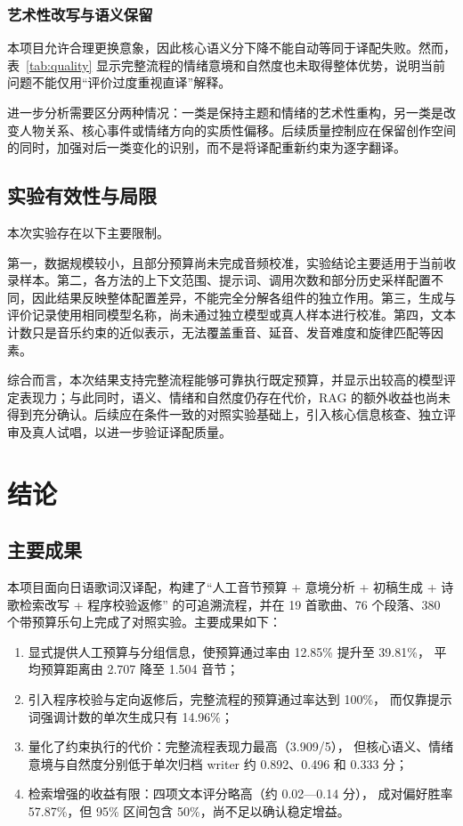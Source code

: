 \documentclass[12pt, a4paper]{ctexart}
\numberwithin{table}{section}
\numberwithin{figure}{section}
\begin{document}
\subsubsection{艺术性改写与语义保留}
本项目允许合理更换意象，因此核心语义分下降不能自动等同于译配失败。然而，表~\ref{tab:quality} 显示完整流程的情绪意境和自然度也未取得整体优势，说明当前问题不能仅用“评价过度重视直译”解释。

进一步分析需要区分两种情况：一类是保持主题和情绪的艺术性重构，另一类是改变人物关系、核心事件或情绪方向的实质性偏移。后续质量控制应在保留创作空间的同时，加强对后一类变化的识别，而不是将译配重新约束为逐字翻译。

\subsection{实验有效性与局限}
本次实验存在以下主要限制。

第一，数据规模较小，且部分预算尚未完成音频校准，实验结论主要适用于当前收录样本。第二，各方法的上下文范围、提示词、调用次数和部分历史采样配置不同，因此结果反映整体配置差异，不能完全分解各组件的独立作用。第三，生成与评价记录使用相同模型名称，尚未通过独立模型或真人样本进行校准。第四，文本计数只是音乐约束的近似表示，无法覆盖重音、延音、发音难度和旋律匹配等因素。

综合而言，本次结果支持完整流程能够可靠执行既定预算，并显示出较高的模型评定表现力；与此同时，语义、情绪和自然度仍存在代价，RAG 的额外收益也尚未得到充分确认。后续应在条件一致的对照实验基础上，引入核心信息核查、独立评审及真人试唱，以进一步验证译配质量。

\section{结论}

\subsection{主要成果}
本项目面向日语歌词汉译配，构建了“人工音节预算 + 意境分析 + 初稿生成 + 诗歌检索改写 + 程序校验返修”
的可追溯流程，并在 19 首歌曲、76 个段落、380 个带预算乐句上完成了对照实验。主要成果如下：
\begin{enumerate}[leftmargin=2em]
  \item 显式提供人工预算与分组信息，使预算通过率由 12.85\% 提升至 39.81\%，
        平均预算距离由 2.707 降至 1.504 音节；
  \item 引入程序校验与定向返修后，完整流程的预算通过率达到 100\%，
        而仅靠提示词强调计数的单次生成只有 14.96\%；
  \item 量化了约束执行的代价：完整流程表现力最高（3.909/5），
        但核心语义、情绪意境与自然度分别低于单次归档 writer 约 0.892、0.496 和 0.333 分；
  \item 检索增强的收益有限：四项文本评分略高（约 0.02—0.14 分），
        成对偏好胜率 57.87\%，但 95\% 区间包含 50\%，尚不足以确认稳定增益。
\end{enumerate}
\end{document}
